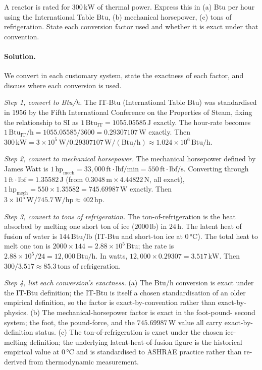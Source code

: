 \begin{exercise}
A reactor is rated for $300 \,\si{\kilo\watt}$ of thermal power.
Express this in (a) Btu per hour using the International Table Btu,
(b) mechanical horsepower, (c) tons of refrigeration. State each
conversion factor used and whether it is exact under that
convention.

\paragraph{Solution.}
We convert in each customary system, state the exactness of each
factor, and discuss where each conversion is used.

\textit{Step 1, convert to Btu/h.} The IT-Btu (International Table
Btu) was standardised in 1956 by the Fifth International Conference
on the Properties of Steam, fixing the relationship to SI as
$1 \,\text{Btu}_{\text{IT}} = 1055.05585 \,\si{\joule}$ exactly.
The hour-rate becomes $1 \,\text{Btu}_{\text{IT}}/\text{h} =
1055.05585 / 3600 = 0.29307107 \,\si{\watt}$ exactly. Then
$300 \,\si{\kilo\watt} = 3 \times 10^{5} \,\si{\watt} / 0.29307107
\,\si{\watt}/(\text{Btu}/\text{h}) \approx 1.024 \times 10^{6}
\,\text{Btu}/\text{h}$.

\textit{Step 2, convert to mechanical horsepower.} The mechanical
horsepower defined by James Watt is $1 \,\text{hp}_{\text{mech}} =
33{,}000 \,\text{ft}\cdot\text{lbf}/\text{min} =
550 \,\text{ft}\cdot\text{lbf}/\text{s}$. Converting through
$1 \,\text{ft}\cdot\text{lbf} = 1.35582 \,\si{\joule}$ (from
$0.3048 \,\si{\meter} \times 4.44822 \,\si{\newton}$, all exact),
$1 \,\text{hp}_{\text{mech}} = 550 \times 1.35582 = 745.69987
\,\si{\watt}$ exactly. Then $3 \times 10^{5} \,\si{\watt} / 745.7
\,\si{\watt}/\text{hp} \approx 402 \,\text{hp}$.

\textit{Step 3, convert to tons of refrigeration.} The
ton-of-refrigeration is the heat absorbed by melting one short ton
of ice ($2000 \,\text{lb}$) in $24 \,\si{\hour}$. The latent heat
of fusion of water is $144 \,\text{Btu}/\text{lb}$ (IT-Btu and
short-ton ice at $0 \,\si{\degreeCelsius}$). The total heat to melt
one ton is $2000 \times 144 = 2.88 \times 10^{5} \,\text{Btu}$; the
rate is $2.88 \times 10^{5} / 24 = 12{,}000 \,\text{Btu}/\text{h}$.
In watts, $12{,}000 \times 0.29307 = 3.517 \,\si{\kilo\watt}$. Then
$300 / 3.517 \approx 85.3 \,\text{tons of refrigeration}$.

\textit{Step 4, list each conversion's exactness.} (a) The Btu/h
conversion is exact under the IT-Btu definition; the IT-Btu is
itself a chosen standardisation of an older empirical definition,
so the factor is exact-by-convention rather than exact-by-physics.
(b) The mechanical-horsepower factor is exact in the foot-pound-
second system; the foot, the pound-force, and the
$745.69987 \,\si{\watt}$ value all carry exact-by-definition status.
(c) The ton-of-refrigeration is exact under the chosen ice-melting
definition; the underlying latent-heat-of-fusion figure is the
historical empirical value at $0 \,\si{\degreeCelsius}$ and is
standardised to ASHRAE practice rather than re-derived from
thermodynamic measurement.


\end{exercise}
